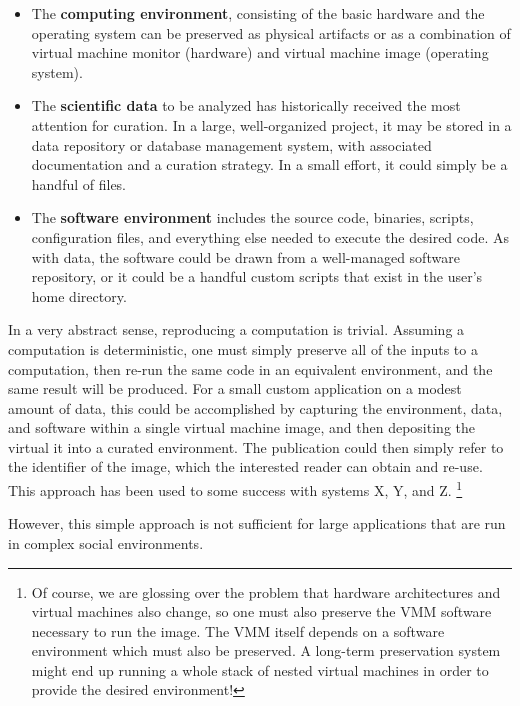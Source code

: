 \documentclass{acm_proc_article-sp}
\begin{document}
\begin{itemize}
\item The {\bf computing environment}, consisting of the basic hardware and the operating system can be preserved as physical artifacts or as a combination of virtual machine monitor (hardware) and virtual machine image (operating system).
\item The {\bf scientific data} to be analyzed has historically received the most attention for curation.  In a large, well-organized project, it may be stored in a  data repository or database management system, with associated documentation and a curation strategy.  In a small effort, it could simply be a handful of files.
\item The {\bf software environment} includes the source code, binaries, scripts, configuration files, and everything else needed to execute the desired code.  As with data, the software could be drawn from a well-managed software repository, or it could be a handful custom scripts that exist in the user's home directory.
\end{itemize}

In a very abstract sense, reproducing a computation is trivial.
Assuming a computation is deterministic, one must simply
preserve all of the inputs to a computation, then re-run
the same code in an equivalent environment, and the same result
will be produced.  For a small custom application on a modest
amount of data, this could be accomplished by capturing the environment,
data, and software within a single virtual machine image,
and then depositing the virtual
it into a curated environment.  The publication could
then simply refer to the identifier of the image, which the
interested reader can obtain and re-use.  This approach has
been used to some success with systems X, Y, and Z.
\footnote{Of course, we are glossing over the problem that hardware
architectures and virtual machines also change, so one must also
preserve the VMM software necessary to run the image.  The VMM itself
depends on a software environment which must also be preserved.
A long-term preservation system might end up running a whole
stack of nested virtual machines in order to provide the desired
environment! }

However, this simple approach is not sufficient for large applications
that are run in complex social environments.
\end{document}
